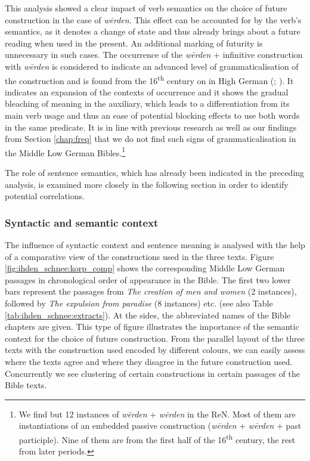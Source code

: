 \documentclass[output=paper,colorlinks,citecolor=brown]{langscibook}
\begin{document}
This analysis showed a clear impact of verb semantics on the choice of future construction in the case of \textit{wērden}. This effect can be accounted for by the verb's semantics, as it denotes a change of state and thus already brings about a future reading when used in the present. An additional marking of futurity is unnecessary in such cases. The occurrence of the \textit{wērden} + infinitive construction with \textit{wērden} is considered to indicate an advanced level of grammaticalisation of the construction and is found from the 16\textsuperscript{th} century on in High German (\cite[17]{Schmid2000}; \cite[28]{concu_werden_2022}). It indicates an expansion of the contexts of occurrence and it shows the gradual bleaching of meaning in the auxiliary, which leads to a differentiation from its main verb usage and thus an ease of potential blocking effects to use both words in the same predicate. It is in line with previous research as well as our findings from Section \ref{chap:freq} that we do not find such signs of grammaticalisation in the Middle Low German Bibles.\footnote{We find but 12 instances of \textit{wērden} + \textit{wērden} in the ReN. Most of them are instantiations of an embedded  passive construction (\textit{wērden} + \textit{wērden} + past participle). Nine of them are from the first half of the 16\textsuperscript{th} century, the rest from later periods.}

The role of sentence semantics, which has already been indicated in the preceding analysis, is examined more closely in the following section in order to identify potential correlations.

\subsubsection{Syntactic and semantic context}\label{chap:context}
The influence of syntactic context and sentence meaning is analysed with the help of a comparative view of the constructions used in the three texts. 
Figure \ref{fig:ihden_schnee:korp_comp} shows the corresponding Middle Low German passages in chronological order of appearance in the Bible. The first two lower bars represent the passages from \textit{The creation of men and women} (2 instances), followed by  \textit{The expulsion from paradise} (8 instances) etc. (see also Table \ref{tab:ihden_schnee:extracts}). At the sides, the abbreviated names of the Bible chapters are given. This type of figure illustrates the importance of the semantic context for the choice of future construction. From the parallel layout of the three texts with the construction used encoded by different colours, we can easily assess where the texts agree and where they disagree in the future construction used. Concurrently we see clustering of certain constructions in certain passages of the Bible texts. 
\end{document}
